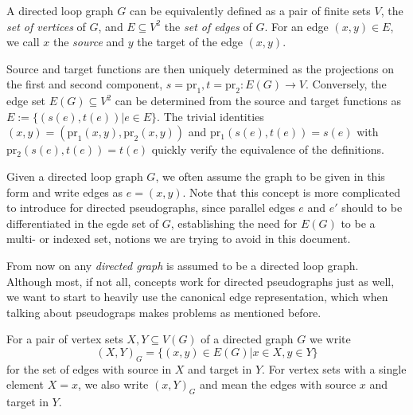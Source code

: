 \begin{remark}
  A directed loop graph $G$ can be equivalently defined as a pair of
  finite sets $V$, the \textit{set of vertices} of
  $G$, and $E \subseteq V^2$ the \textit{set of edges} of $G$. For an
  edge $(x,y) \in E$, we call $x$ the \textit{source} and $y$ the
  target of the edge $(x,y)$.

  Source and target functions are then uniquely determined as the
  projections on the first and second component, $s = \mathrm{pr}_1, t
  = \mathrm{pr}_2: E(G) \to V.$ Conversely, the edge set $E(G)
  \subseteq V^2$ can be determined from the source and target
  functions as $E:=\{(s(e),t(e)) | e \in E\}$. The trivial identities
  $(x,y) = (\mathrm{pr}_1(x,y),\mathrm{pr}_2(x,y))$ and
  $\mathrm{pr_1}(s(e), t(e)) = s(e)$ with $\mathrm{pr_2}(s(e), t(e)) =
  t(e)$ quickly verify the equivalence of the definitions.

  Given a directed loop graph $G$, we often assume the graph to be
  given in this form and write edges as $e=(x,y)$. Note that this
  concept is more complicated to introduce for directed pseudographs,
  since parallel edges $e$ and $e'$ should to be differentiated in the
  egde set of $G$, establishing the need for $E(G)$ to be a multi- or
  indexed set, notions we are trying to avoid in this document.
\end{remark}







From now on any \textit{directed graph} is assumed to be a directed
loop graph. Although most, if not all, concepts work for directed
pseudographs just as well, we want to start to heavily use the
canonical edge representation, which when talking about pseudograps
makes problems as mentioned before.

\begin{remark} 
   For a pair of vertex sets $X,Y
  \subseteq V(G)$ of a directed graph $G$ we write
  \[
  (X,Y)_G = \{(x,y) \in E(G) | x \in X, y \in Y \}
  \]
  for the set of edges with source in $X$ and target in $Y$. For
  vertex sets with a single element $X = {x}$, we also write $(x,Y)_G$
  and mean the edges with source $x$ and target in $Y$.
\end{remark}


